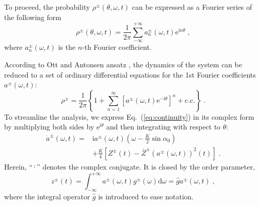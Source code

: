 \documentclass{article}
\begin{document}
To proceed, the probability $\rho ^{\pm}\left( \theta ,\omega ,t \right)$ can be expressed as a Fourier series of the following form
\begin{equation}
    \rho ^{\pm}\left( \theta ,\omega ,t \right) =\frac{1}{2\pi}\sum_{-\infty}^{+\infty}{a^{\pm} _n\left( \omega ,t \right) \mathrm{e}^{\mathrm{i}n\theta}}\;,
\end{equation}
where $a^{\pm} _n\left( \omega ,t \right)$ is the $n$-th Fourier coefficient.

According to Ott and Antonsen ansatz \cite{10.1063/1.2930766, 10.1063/1.3136851}, the dynamics of the system can be reduced to a set of ordinary differential equations for the 1st Fourier coefficients $a^{\pm}\left( \omega ,t \right)$:
\begin{equation}
    \rho ^{\pm}=\frac{1}{2\pi}\left\{ 1+\sum_{n=1}^{\infty}{\left[ a^{\pm} \left( \omega ,t \right) \mathrm{e}^{-\mathrm{i}\theta} \right] ^n+\mathrm{c}.\mathrm{c}.} \right\} \;.
\end{equation}
To streamline the analysis, we express Eq.~(\ref{eq:continuity}) in its complex form by multiplying both sides by $\mathrm{e}^{\mathrm{i}\theta}$ and then integrating with respect to $\theta$:
\begin{equation}
    \label{eq:aDynamics}
    \begin{aligned}
        \dot{a}^{\pm}\left( \omega ,t \right) =&\mathrm{i}a^{\pm}\left( \omega ,t \right) \left( \omega -\frac{K}{2}\sin \alpha _0 \right)\\
        &+\frac{K}{4}\left[ Z^{\pm}\left( t \right) -\bar{Z}^{\pm}\left( a^{\pm}\left( \omega ,t \right) \right) ^2\left( t \right) \right] \;.
    \end{aligned}
\end{equation}
Herein, \enquote{$\bar{\cdot}$} denotes the complex conjugate.
It is closed by the order parameter,
\begin{equation}
    \label{eq:zEqs2a}
    z^{\pm}\left( t \right) =\int_{-\infty}^{+\infty}{a^{\pm}\left( \omega ,t \right) g^{\pm}\left( \omega \right) \mathrm{d}\omega =}\hat{g}a^{\pm} \left( \omega ,t \right)\;,
\end{equation}
where the integral operator $\hat{g}$ is introduced to ease notation.
\end{document}
